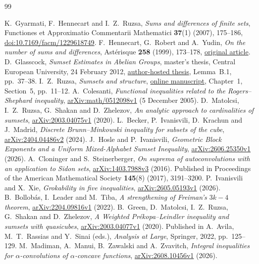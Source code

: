 \documentclass[11pt]{article}
\theoremstyle{remark}
\numberwithin{equation}{section}
\begin{document}
\begin{thebibliography}{99}
\small\raggedright
\setlength{\itemsep}{3pt}
K.~Gyarmati, F.~Hennecart and I.~Z.~Ruzsa,
\emph{Sums and differences of finite sets},
Functiones et Approximatio Commentarii Mathematici \textbf{37}(1) (2007),
175--186,
\href{https://doi.org/10.7169/facm/1229618749}{doi:10.7169/facm/1229618749}.
F.~Hennecart, G.~Robert and A.~Yudin,
\emph{On the number of sums and differences},
Ast\'erisque \textbf{258} (1999), 173--178,
\href{https://www.numdam.org/item/AST_1999__258__173_0/}{original article}.
D.~Glasscock,
\emph{Sumset Estimates in Abelian Groups},
master's thesis, Central European University, 24 February 2012,
\href{https://sites.uml.edu/daniel-glasscock/files/2021/06/MSThesis.pdf}
{author-hosted thesis}, Lemma~B.1, pp.~37--38.
I.~Z.~Ruzsa,
\emph{Sumsets and structure},
\href{https://tensen.net/research/static/gc-data/sumset/Additive-Combinatorics.pdf}
{online manuscript}, Chapter~1, Section~5, pp.~11--12.
A.~Colesanti,
\emph{Functional inequalities related to the Rogers--Shephard inequality},
\href{https://arxiv.org/abs/math/0512098v1}{arXiv:math/0512098v1}
(5 December 2005).
D.~Matolcsi, I.~Z.~Ruzsa, G.~Shakan and D.~Zhelezov,
\emph{An analytic approach to cardinalities of sumsets},
\href{https://arxiv.org/abs/2003.04075v1}{arXiv:2003.04075v1} (2020).
L.~Becker, P.~Ivanisvili, D.~Krachun and J.~Madrid,
\emph{Discrete Brunn--Minkowski inequality for subsets of the cube},
\href{https://arxiv.org/abs/2404.04486v2}{arXiv:2404.04486v2} (2024).
J.~Hosle and P.~Ivanisvili,
\emph{Geometric Block Exponents and a Uniform Mixed-Alphabet Sumset Inequality},
\href{https://arxiv.org/abs/2606.25350v1}{arXiv:2606.25350v1} (2026).
A.~Cloninger and S.~Steinerberger,
\emph{On suprema of autoconvolutions with an application to Sidon sets},
\href{https://arxiv.org/abs/1403.7988v3}{arXiv:1403.7988v3} (2016).
Published in Proceedings of the American Mathematical Society
\textbf{145}(8) (2017), 3191--3200.
P.~Ivanisvili and X.~Xie,
\emph{Grokability in five inequalities},
\href{https://arxiv.org/abs/2605.05193v1}{arXiv:2605.05193v1} (2026).
B.~Bollob\'as, I.~Leader and M.~Tiba,
\emph{A strengthening of Freiman's $3k-4$ theorem},
\href{https://arxiv.org/abs/2204.09816v1}{arXiv:2204.09816v1} (2022).
B.~Green, D.~Matolcsi, I.~Z.~Ruzsa, G.~Shakan and D.~Zhelezov,
\emph{A Weighted Pr\'ekopa--Leindler inequality and sumsets with quasicubes},
\href{https://arxiv.org/abs/2003.04077v1}{arXiv:2003.04077v1} (2020).
Published in A.~Avila, M.~T.~Rassias and Y.~Sinai (eds.),
\emph{Analysis at Large}, Springer, 2022, pp.~125--129.
M.~Madiman, A.~Manui, B.~Zawalski and A.~Zvavitch,
\emph{Integral inequalities for $\alpha$-convolutions of $\alpha$-concave functions},
\href{https://arxiv.org/abs/2608.10456v1}{arXiv:2608.10456v1} (2026).
\end{thebibliography}
\end{document}

